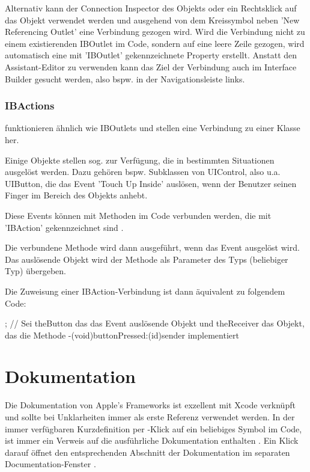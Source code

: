 \documentclass[parskip=half, final]{scrreprt}
\begin{document}
Alternativ kann der Connection Inspector des Objekts  oder ein Rechtsklick auf das Objekt verwendet werden und ausgehend von dem Kreissymbol neben 'New Referencing Outlet' eine Verbindung gezogen wird. Wird die Verbindung nicht zu einem existierenden IBOutlet im Code, sondern auf eine leere Zeile gezogen, wird automatisch eine mit 'IBOutlet' gekennzeichnete Property erstellt. Anstatt den Assistant-Editor zu verwenden kann das Ziel der Verbindung auch im Interface Builder gesucht werden, also bspw. in der Navigationsleiste links.

\subsubsection{IBActions}

 funktionieren ähnlich wie IBOutlets und stellen eine Verbindung zu  einer Klasse her.

Einige Objekte stellen sog.  zur Verfügung, die in bestimmten Situationen ausgelöst werden. Dazu gehören bspw. Subklassen von UIControl, also u.a. UIButton, die das Event 'Touch Up Inside' auslösen, wenn der Benutzer seinen Finger im Bereich des Objekts anhebt.

Diese Events können mit Methoden im Code verbunden werden, die mit 'IBAction' gekennzeichnet sind .


Die verbundene Methode wird dann ausgeführt, wenn das Event ausgelöst wird. Das auslösende Objekt wird der Methode als Parameter  des Typs  (beliebiger Typ) übergeben.

Die Zuweisung einer IBAction-Verbindung ist dann äquivalent zu folgendem Code:
\begin{objclst}
; // Sei theButton das das Event auslösende Objekt und theReceiver das Objekt, das die Methode -(void)buttonPressed:(id)sender implementiert
\end{objclst}

\section{Dokumentation}\label{sec:xcode_documentation}

Die Dokumentation von Apple's Frameworks ist exzellent mit Xcode verknüpft und sollte bei Unklarheiten immer als erste Referenz verwendet werden. In der immer verfügbaren Kurzdefinition per \keys{\altkey}-Klick auf ein beliebiges Symbol im Code, ist immer ein Verweis auf die ausführliche Dokumentation enthalten . Ein Klick darauf öffnet den entsprechenden Abschnitt der Dokumentation im separaten Documentation-Fenster .
\end{document}
